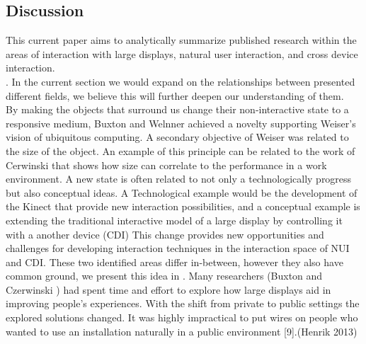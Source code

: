 \subsection{Discussion}
This current paper aims to analytically summarize published research within the areas of interaction with large displays, natural user interaction, and cross device interaction.\\. In the current section we would expand on the relationships between presented different fields, we believe this will further deepen our understanding of them.\\
By making the objects that surround us change their non-interactive state to a responsive medium, Buxton and Welnner achieved a novelty supporting Weiser's vision of ubiquitous computing. A secondary objective of Weiser was related to the size of the object. An example of this principle can be related to the work of Cerwinski that shows how size can correlate to the performance in a work environment.
A new state is often related to not only a technologically progress but also conceptual ideas. A Technological example would be the development of the Kinect that provide new interaction possibilities, and a conceptual example is extending the traditional interactive model of a large display by controlling it with a another device (CDI)
This change provides new opportunities and challenges for developing interaction techniques in the interaction space of NUI and CDI. These two identified areas differ in-between, however they also have common ground, we present this idea in .
Many researchers (Buxton and Czerwinski ) had spent time and effort to explore how large displays aid in improving people's experiences. 
With the shift from private to public settings the explored solutions changed. 
It was highly impractical to put wires on people who wanted to use an installation naturally in a public environment [9].(Henrik 2013)\\

